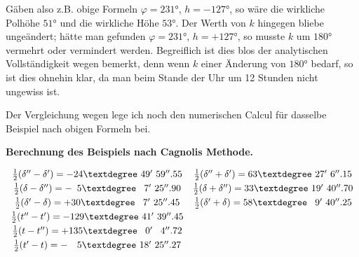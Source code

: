 \documentclass[10pt,a4paper]{article}
\begin{document}
Gäben also z.B. obige Formeln $\varphi = 231°$, $h = -127°$, so wäre die wirkliche Polhöhe $51°$ und die wirkliche Höhe $53°$. Der Werth von $k$ hingegen bliebe ungeändert; hätte man gefunden $\varphi = 231°$, $h = +127°$, so musste $k$ um $180°$ vermehrt oder vermindert werden. Begreiflich ist dies blos der analytischen Vollständigkeit wegen bemerkt, denn wenn $k$ einer Änderung von $180°$ bedarf, so ist dies ohnehin klar, da man beim Stande der Uhr um 12 Stunden nicht ungewiss ist.

Der Vergleichung wegen lege ich noch den numerischen Calcul für dasselbe Beispiel nach obigen Formeln bei.

\begin{center}
\textbf{Berechnung des Beispiels nach Cagnolis Methode.}
\end{center}

\[
\begin{array}{r@{\hspace{1em}}r@{\hspace{2em}}r}
\multicolumn{2}{c}{\tfrac{1}{2}(\delta'' - \delta') = -24°\ 49'\ 59''.55} & \multicolumn{1}{c}{\tfrac{1}{2}(\delta'' + \delta') = 63°\ 27'\ 6''.15} \\[0.3em]
\multicolumn{2}{c}{\tfrac{1}{2}(\delta - \delta'') = -\phantom{2}5°\ \phantom{4}7'\ 25''.90} & \multicolumn{1}{c}{\tfrac{1}{2}(\delta + \delta'') = 33°\ 19'\ 40''.70} \\[0.3em]
\multicolumn{2}{c}{\tfrac{1}{2}(\delta' - \delta) = +30°\ \phantom{4}7'\ 25''.45} & \multicolumn{1}{c}{\tfrac{1}{2}(\delta' + \delta) = 58°\ \phantom{4}9'\ 40''.25} \\[0.3em]
\multicolumn{2}{c}{\tfrac{1}{2}(t'' - t') = -129°\ 41'\ 39''.45} & \\[0.3em]
\multicolumn{2}{c}{\tfrac{1}{2}(t - t'') = +135°\ \phantom{4}0'\ \phantom{3}4''.72} & \\[0.3em]
\multicolumn{2}{c}{\tfrac{1}{2}(t' - t) = -\phantom{12}5°\ 18'\ 25''.27} &
\end{array}
\]
\end{document}
